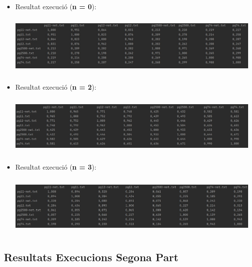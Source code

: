 \documentclass[11pt,a4paper]{article}
\begin{document}
			\begin{itemize}
			
				\item Resultat execució (\textbf{n = 0}):
			
				\begin{center}
					\includegraphics[height=3cm]{captures/primeraPart/vectorspacemodel/execucio0.jpg}
				\end{center}
				
				\item Resultat execució (\textbf{n = 2}):
				
				\begin{center}
					\includegraphics[height=3cm]{captures/primeraPart/vectorspacemodel/execucio2.jpg}
				\end{center}
				
				\item Resultat execució (\textbf{n = 3}):
				
				\begin{center}
					\includegraphics[height=3cm]{captures/primeraPart/vectorspacemodel/execucio3.jpg}
				\end{center}	
			
			\end{itemize}
			
	\subsection{Resultats Execucions Segona Part}
	
\end{document}

